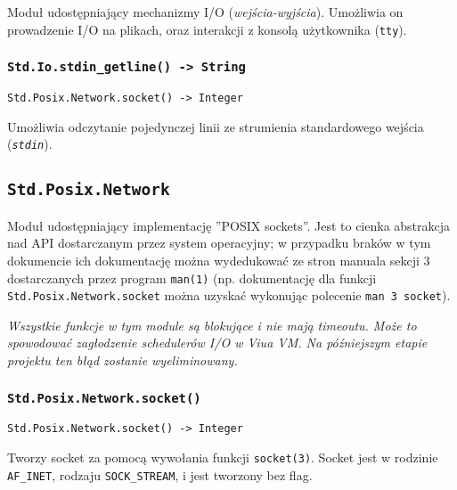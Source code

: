 Moduł udostępniający mechanizmy I/O (\emph{wejścia-wyjścia}). Umożliwia on prowadzenie I/O na plikach, oraz
interakcji z konsolą użytkownika (\texttt{tty}).

\subsubsection{\texttt{Std.Io.stdin\_getline() -> String}}

\begin{small}
\begin{lstlisting}
Std.Posix.Network.socket() -> Integer
\end{lstlisting}
\end{small}

Umożliwia odczytanie pojedynczej linii ze strumienia standardowego wejścia (\emph{\texttt{stdin}}).

\subsection{\texttt{Std.Posix.Network}}
\label{stdlib_Std_Posix_Network}

Moduł udostępniający implementację ''POSIX sockets''. Jest to cienka abstrakcja nad API dostarczanym przez
system operacyjny; w przypadku braków w tym dokumencie ich dokumentację można wydedukować ze stron manuala
sekcji 3 dostarczanych przez program \texttt{man(1)} (np. dokumentację dla funkcji
\texttt{Std.Posix.Network.socket} można uzyskać wykonując polecenie \texttt{man 3 socket}).

\begin{center}
\emph{Wszystkie funkcje w tym module są blokujące i nie mają timeoutu. Może to spowodować zagłodzenie
schedulerów I/O w Viua VM. Na późniejszym etapie projektu ten błąd zostanie wyeliminowany.}
\end{center}

\subsubsection{\texttt{Std.Posix.Network.socket()}}

\begin{small}
\begin{lstlisting}
Std.Posix.Network.socket() -> Integer
\end{lstlisting}
\end{small}

Tworzy socket za pomocą wywołania funkcji \texttt{socket(3)}.
Socket jest w rodzinie \texttt{AF\_INET}, rodzaju \texttt{SOCK\_STREAM}, i jest tworzony bez flag.

